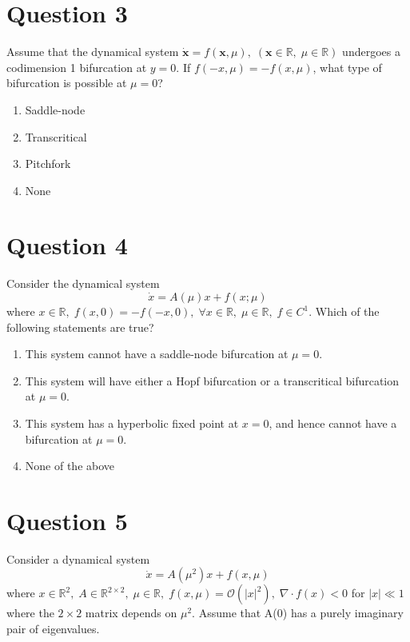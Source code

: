 \documentclass[twoside,10pt,a4paper]{article}
\begin{document}
\section*{Question 3}
Assume that the dynamical system $\dot{\mathbf{x}} = f(\mathbf{x}, \mu), \; (\mathbf{x} \in \mathbb{R}, \; \mu \in \mathbb{R})$ undergoes a codimension 1 bifurcation at $y = 0$. If $f(-x, \mu) = -f(x, \mu)$, what type of bifurcation is possible at $\mu = 0$?

\begin{enumerate}[label=(\alph*)]
	\item Saddle-node
	\item Transcritical
	\item Pitchfork
	\item None
\end{enumerate}

\newpage

\section*{Question 4}
Consider the dynamical system
\begin{equation*}
	\dot{x} = A(\mu)x + f(x;\mu)
\end{equation*}
where $ x \in \mathbb{R}, \; f(x,0) = -f(-x,0),\; \forall x \in \mathbb{R}, \; \mu \in \mathbb{R}, \; f\in C^1 $. Which of the following statements are true?

\begin{enumerate}[label=(\alph*)]
	\item This system cannot have a saddle-node bifurcation at $\mu = 0$.
	\item This system will have either a Hopf bifurcation or a transcritical bifurcation at $\mu = 0$.
	\item This system has a hyperbolic fixed point at $x = 0$, and hence cannot have a bifurcation at $\mu = 0$.
	\item None of the above
\end{enumerate}

\section*{Question 5}
Consider a dynamical system
\begin{equation*}
	\dot{x} = A(\mu^2)x + f(x, \mu)
\end{equation*}
where $x \in \mathbb{R}^2,\; A\in \mathbb{R}^{2 \times 2}, \; \mu \in \mathbb{R}, \; f(x, \mu) = \mathcal{O}(|x|^2), \; \nabla \cdot f(x) < 0$ for $|x| \ll 1$ where the $2 \times 2$ matrix depends on $\mu^2$. Assume that A(0) has a purely imaginary pair of eigenvalues.
\end{document}
